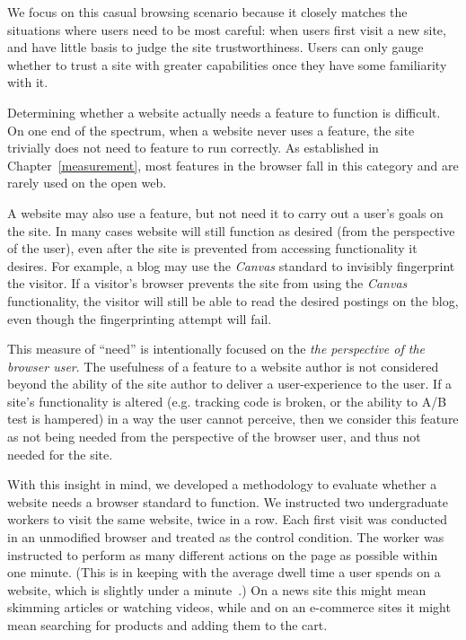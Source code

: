 We focus on this casual browsing scenario because it closely matches the
situations where users need to be most careful: when users first visit a new
site, and have little basis to judge the site trustworthiness.
Users can only gauge whether to trust a site with greater
capabilities once they have some familiarity with it.

Determining whether a website actually needs a feature to function is difficult.
On one end of the spectrum, when a website never uses a feature, the
site trivially does not need to feature to run correctly.  As established in
Chapter~\ref{measurement}, most features in the browser fall in this category
and are rarely used on the open web.

A website may also use a feature, but not need it to carry out a user's
goals on the site.  In many cases website will still function as desired (from
the perspective of the user), even after the site is prevented from accessing
functionality it desires.  For example, a blog may use the \textit{Canvas}
standard to invisibly fingerprint the visitor.  If a visitor's browser prevents
the site from using the \textit{Canvas} functionality, the visitor will still
be able to read the desired postings on the blog, even though the
fingerprinting attempt will fail.

This measure of ``need'' is intentionally focused on the \emph{the perspective
of the browser user}.  The usefulness of a feature to a website author is not
considered beyond the ability of the site author to deliver a user-experience
to the user. If a site's functionality is altered (e.g. tracking code is
broken, or the ability to A/B test is hampered) in a way the user cannot
perceive, then we consider this feature as not being needed from the
perspective of the browser user, and thus not needed for the site.

With this insight in mind, we developed a methodology to evaluate
whether a website needs a browser standard to function. We instructed two
undergraduate workers to visit the same website, twice in a row. Each first visit
was conducted in an unmodified \FF browser and treated as the control condition.
The worker was instructed to perform as many different actions on the page as
possible within one minute. (This is in keeping with the average dwell time a
user spends on a website, which is slightly under a minute~\cite{liu2010understanding}.)
On a news site this might mean skimming articles or watching videos, while
and on an e-commerce sites it might mean searching for products and
adding them to the cart.

